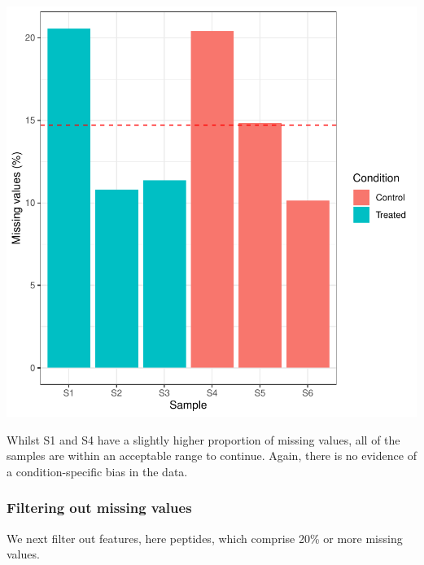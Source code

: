 \documentclass[9pt,a4paper,]{extarticle}
\newenvironment{Shaded}{\begin{snugshade}}{\end{snugshade}}
\newcommand{\DecValTok}[1]{\textcolor[rgb]{0.00,0.00,0.81}{#1}}
\newcommand{\DocumentationTok}[1]{\textcolor[rgb]{0.56,0.35,0.01}{\textbf{\textit{#1}}}}
\newcommand{\FunctionTok}[1]{\textcolor[rgb]{0.00,0.00,0.00}{#1}}
\newcommand{\NormalTok}[1]{#1}
\newcommand{\SpecialCharTok}[1]{\textcolor[rgb]{0.00,0.00,0.00}{#1}}
\newcommand{\StringTok}[1]{\textcolor[rgb]{0.31,0.60,0.02}{#1}}
\begin{document}
\begin{center}\includegraphics[height=0.4\textheight]{workflow_expressions_files/figure-latex/lfq_missing_data_2-1} \end{center}

Whilst S1 and S4 have a slightly higher proportion of missing values, all of the
samples are within an acceptable range to continue. Again, there is no evidence
of a condition-specific bias in the data.

\hypertarget{filtering-out-missing-values-1}{%
\subsubsection{Filtering out missing values}\label{filtering-out-missing-values-1}}

We next filter out features, here peptides, which comprise 20\% or more missing
values.

\begin{Shaded}
\end{Shaded}
\end{document}
